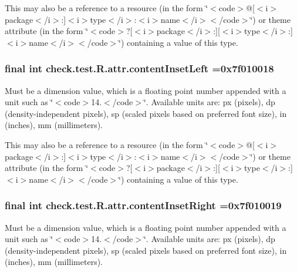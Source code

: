 This may also be a reference to a resource (in the form \char`\"{}$<$code$>$@\mbox{[}$<$i$>$package$<$/i$>$\+:\mbox{]}$<$i$>$type$<$/i$>$\+:$<$i$>$name$<$/i$>$$<$/code$>$\char`\"{}) or theme attribute (in the form \char`\"{}$<$code$>$?\mbox{[}$<$i$>$package$<$/i$>$\+:\mbox{]}\mbox{[}$<$i$>$type$<$/i$>$\+:\mbox{]}$<$i$>$name$<$/i$>$$<$/code$>$\char`\"{}) containing a value of this type. \hypertarget{classcheck_1_1test_1_1_r_1_1attr_a17f59061d06d3a375e4d728f01e99a9b}{}
\subsubsection[{content\+Inset\+Left}]{\setlength{\rightskip}{0pt plus 5cm}final int check.\+test.\+R.\+attr.\+content\+Inset\+Left =0x7f010018\hspace{0.3cm}{\ttfamily [static]}}\label{classcheck_1_1test_1_1_r_1_1attr_a17f59061d06d3a375e4d728f01e99a9b}
Must be a dimension value, which is a floating point number appended with a unit such as \char`\"{}$<$code$>$14.\+5sp$<$/code$>$\char`\"{}. Available units are\+: px (pixels), dp (density-\/independent pixels), sp (scaled pixels based on preferred font size), in (inches), mm (millimeters). 

This may also be a reference to a resource (in the form \char`\"{}$<$code$>$@\mbox{[}$<$i$>$package$<$/i$>$\+:\mbox{]}$<$i$>$type$<$/i$>$\+:$<$i$>$name$<$/i$>$$<$/code$>$\char`\"{}) or theme attribute (in the form \char`\"{}$<$code$>$?\mbox{[}$<$i$>$package$<$/i$>$\+:\mbox{]}\mbox{[}$<$i$>$type$<$/i$>$\+:\mbox{]}$<$i$>$name$<$/i$>$$<$/code$>$\char`\"{}) containing a value of this type. \hypertarget{classcheck_1_1test_1_1_r_1_1attr_a72fa272b4d22878eaf90ba1b801a2aa2}{}
\subsubsection[{content\+Inset\+Right}]{\setlength{\rightskip}{0pt plus 5cm}final int check.\+test.\+R.\+attr.\+content\+Inset\+Right =0x7f010019\hspace{0.3cm}{\ttfamily [static]}}\label{classcheck_1_1test_1_1_r_1_1attr_a72fa272b4d22878eaf90ba1b801a2aa2}
Must be a dimension value, which is a floating point number appended with a unit such as \char`\"{}$<$code$>$14.\+5sp$<$/code$>$\char`\"{}. Available units are\+: px (pixels), dp (density-\/independent pixels), sp (scaled pixels based on preferred font size), in (inches), mm (millimeters). 

